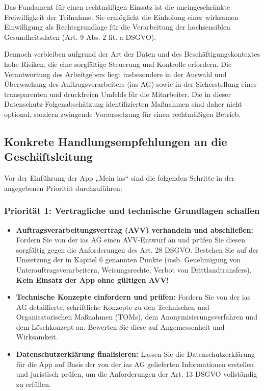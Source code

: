 \documentclass[12pt, a4paper]{article}
\begin{document}
Das Fundament für einen rechtmäßigen Einsatz ist die uneingeschränkte Freiwilligkeit der Teilnahme. Sie ermöglicht die Einholung einer wirksamen Einwilligung als Rechtsgrundlage für die Verarbeitung der hochsensiblen Gesundheitsdaten (Art. 9 Abs. 2 lit. a DSGVO).

Dennoch verbleiben aufgrund der Art der Daten und des Beschäftigungskontextes hohe Risiken, die eine sorgfältige Steuerung und Kontrolle erfordern. Die Verantwortung des Arbeitgebers liegt insbesondere in der Auswahl und Überwachung des Auftragsverarbeiters (ias AG) sowie in der Sicherstellung eines transparenten und druckfreien Umfelds für die Mitarbeiter. Die in dieser Datenschutz-Folgenabschätzung identifizierten Maßnahmen sind daher nicht optional, sondern zwingende Voraussetzung für einen rechtmäßigen Betrieb.

\subsection{Konkrete Handlungsempfehlungen an die Geschäftsleitung}
Vor der Einführung der App „Mein ias“ sind die folgenden Schritte in der angegebenen Priorität durchzuführen:

\subsubsection*{Priorität 1: Vertragliche und technische Grundlagen schaffen}
\begin{itemize}
    \item \textbf{Auftragsverarbeitungsvertrag (AVV) verhandeln und abschließen:} Fordern Sie von der ias AG einen AVV-Entwurf an und prüfen Sie diesen sorgfältig gegen die Anforderungen des Art. 28 DSGVO. Bestehen Sie auf der Umsetzung der in Kapitel 6 genannten Punkte (insb. Genehmigung von Unterauftragsverarbeitern, Weisungsrechte, Verbot von Drittlandtransfers). \textbf{Kein Einsatz der App ohne gültigen AVV!}
    \item \textbf{Technische Konzepte einfordern und prüfen:} Fordern Sie von der ias AG detaillierte, schriftliche Konzepte zu den Technischen und Organisatorischen Maßnahmen (TOMs), dem Anonymisierungsverfahren und dem Löschkonzept an. Bewerten Sie diese auf Angemessenheit und Wirksamkeit.
    \item \textbf{Datenschutzerklärung finalisieren:} Lassen Sie die Datenschutzerklärung für die App auf Basis der von der ias AG gelieferten Informationen erstellen und juristisch prüfen, um die Anforderungen der Art. 13 DSGVO vollständig zu erfüllen.
\end{itemize}
\end{document}
